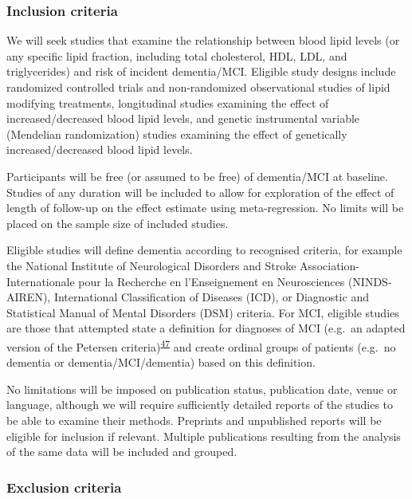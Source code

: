 \documentclass[a4paper, twoside]{templates/ociamthesis}
\begin{document}
\hypertarget{inclusion-criteria}{%
\subsubsection{Inclusion criteria}\label{inclusion-criteria}}

We will seek studies that examine the relationship between blood lipid levels (or any specific lipid fraction, including total cholesterol, HDL, LDL, and triglycerides) and risk of incident dementia/MCI. Eligible study designs include randomized controlled trials and non-randomized observational studies of lipid modifying treatments, longitudinal studies examining the effect of increased/decreased blood lipid levels, and genetic instrumental variable (Mendelian randomization) studies examining the effect of genetically increased/decreased blood lipid levels.

Participants will be free (or assumed to be free) of dementia/MCI at baseline. Studies of any duration will be included to allow for exploration of the effect of length of follow-up on the effect estimate using meta-regression. No limits will be placed on the sample size of included studies.

Eligible studies will define dementia according to recognised criteria, for example the National Institute of Neurological Disorders and Stroke Association-Internationale pour la Recherche en l'Enseignement en Neurosciences (NINDS-AIREN), International Classification of Diseases (ICD), or Diagnostic and Statistical Manual of Mental Disorders (DSM) criteria. For MCI, eligible studies are those that attempted state a definition for diagnoses of MCI (e.g.~an adapted version of the Petersen criteria)\textsuperscript{\protect\hyperlink{ref-petersen1999}{47}} and create ordinal groups of patients (e.g.~no dementia or dementia/MCI/dementia) based on this definition.

No limitations will be imposed on publication status, publication date, venue or language, although we will require sufficiently detailed reports of the studies to be able to examine their methods. Preprints and unpublished reports will be eligible for inclusion if relevant. Multiple publications resulting from the analysis of the same data will be included and grouped.

\hypertarget{exclusion-criteria}{%
\subsubsection{Exclusion criteria}\label{exclusion-criteria}}
\end{document}
